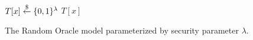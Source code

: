 \begin{figure}[t]
\begin{algorithm}[H]
    \caption{\label{alg.ro} The Random Oracle model parameterized by security
             parameter $\lambda$.}
    \begin{algorithmic}[1]
                \State$T[x] \overset{\$}{\gets} \{0, 1\}^\lambda$
            \EndIf
            \State\Return$T[x]$
        \EndFunction
        \vskip8pt
    \end{algorithmic}
\end{algorithm}
\end{figure}
